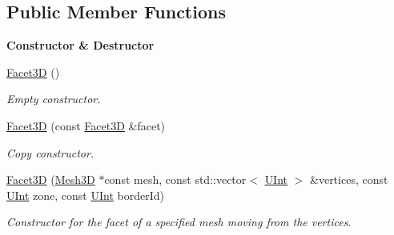 \subsection*{Public Member Functions}
\begin{Indent}{\bf Constructor \& Destructor}\par
\begin{DoxyCompactItemize}
\item 
\hyperlink{classFVCode3D_1_1Mesh3D_1_1Facet3D_a6a7aee209946492b9b0d31e04e33a290}{Facet3D} ()
\begin{DoxyCompactList}\small\item\em Empty constructor. \end{DoxyCompactList}\item 
\hyperlink{classFVCode3D_1_1Mesh3D_1_1Facet3D_a0eff032c65d0fad89835a77c683b60ce}{Facet3D} (const \hyperlink{classFVCode3D_1_1Mesh3D_1_1Facet3D}{Facet3D} \&facet)
\begin{DoxyCompactList}\small\item\em Copy constructor. \end{DoxyCompactList}\item 
\hyperlink{classFVCode3D_1_1Mesh3D_1_1Facet3D_aff7e597dcc26f5733b0e954a2e73afab}{Facet3D} (\hyperlink{classFVCode3D_1_1Mesh3D}{Mesh3D} $\ast$const mesh, const std\+::vector$<$ \hyperlink{namespaceFVCode3D_a4bf7e328c75d0fd504050d040ebe9eda}{U\+Int} $>$ \&vertices, const \hyperlink{namespaceFVCode3D_a4bf7e328c75d0fd504050d040ebe9eda}{U\+Int} zone, const \hyperlink{namespaceFVCode3D_a4bf7e328c75d0fd504050d040ebe9eda}{U\+Int} border\+Id)
\begin{DoxyCompactList}\small\item\em Constructor for the facet of a specified mesh moving from the vertices. \end{DoxyCompactList}\end{DoxyCompactItemize}
\end{Indent}

